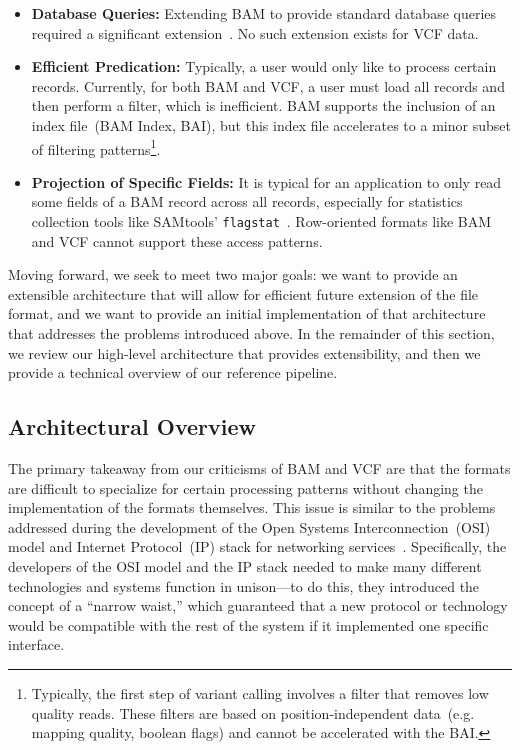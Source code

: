 \documentclass{bioinfo}
\begin{document}
\begin{itemize}
\item \textbf{Database Queries:} Extending BAM to provide standard database queries required a significant extension~\citep{kozanitis13}.
No such extension exists for VCF data.
\item \textbf{Efficient Predication:} Typically, a user would only like to process certain records. Currently, for both BAM and VCF, a user must load all
records and then perform a filter, which is inefficient. BAM supports the inclusion of an index file~(BAM Index, BAI), but this index file accelerates
to a minor subset of filtering patterns\footnote{Typically, the first step of variant calling involves a filter that removes low quality reads. These filters
are based on position-independent data~(e.g. mapping quality, boolean flags) and cannot be accelerated with the BAI.}.
\item \textbf{Projection of Specific Fields:} It is typical for an application to only read some fields of a BAM record across all records, especially for
statistics collection tools like SAMtools' \texttt{flagstat}~\citep{li09}. Row-oriented formats like BAM and VCF cannot support these access patterns.
\end{itemize}

Moving forward, we seek to meet two major goals: we want to provide an extensible architecture that will allow for efficient future extension of the
file format, and we want to provide an initial implementation of that architecture that addresses the problems introduced above. In the remainder
of this section, we review our high-level architecture that provides extensibility, and then we provide a technical overview of our reference pipeline.

\subsection{Architectural Overview}
\label{sec:architectural-overview}

The primary takeaway from our criticisms of BAM and VCF are that the formats are difficult to specialize for certain processing patterns without
changing the implementation of the formats themselves. This issue is similar to the problems addressed during the development of the Open
Systems Interconnection~(OSI) model and Internet Protocol~(IP) stack for networking services~\citep{zimmermann80}. Specifically, the developers
of the OSI model and the IP stack needed to make many different technologies and systems function in unison---to do this, they introduced the
concept of a ``narrow waist,'' which guaranteed that a new protocol or technology would be compatible with the rest of the system if it implemented
one specific interface.
\end{document}
